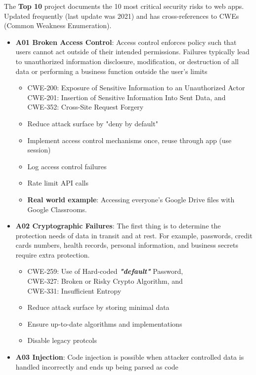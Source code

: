 \documentclass[11pt]{article}
\begin{document}
The \textbf{Top 10} project documents the 10 most critical security risks to web apps. Updated frequently (last update was 2021) and has cross-references to CWEs (Common Weakness Enumeration).

\begin{itemize}
	\item \textbf{A01 Broken Access Control}: Access control enforces policy such that users cannot act outside of their intended permissions. Failures typically lead to unauthorized information disclosure, modification, or destruction of all data or performing a business function outside the user's limits
		\begin{itemize}
			\item CWE-200: Exposure of Sensitive Information to an Unauthorized Actor \\
			  CWE-201: Insertion of Sensitive Information Into Sent Data, and \\
			  CWE-352: Cross-Site Request Forgery
			\item Reduce attack surface by "deny by default"
			\item Implement access control mechanisms once, reuse through app (use session)
			\item Log access control failures
			\item Rate limit API calls
			\item \textbf{Real world example}: Accessing everyone's Google Drive files with Google Classrooms. 
		\end{itemize}
	\item \textbf{A02 Cryptographic Failures}: The first thing is to determine the protection needs of data in transit and at rest. For example, passwords, credit cards numbers, health records, personal information, and business secrets require extra protection.
		\begin{itemize}
			\item CWE-259: Use of Hard-coded \textbf{\textit{"default"}} Password, \\
			  CWE-327: Broken or Risky Crypto Algorithm, and \\
			  CWE-331: Insufficient Entropy
			\item Reduce attack surface by storing minimal data
			\item Ensure up-to-date algorithms and implementations
			\item Disable legacy protcols
		\end{itemize}
	\item \textbf{A03 Injection}: Code injection is possible when attacker controlled data is handled incorrectly and ends up being parsed as code

\end{itemize}
\end{document}
